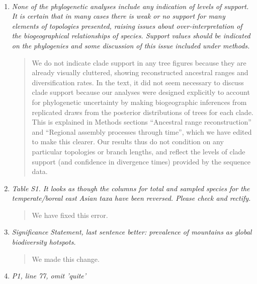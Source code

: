 \documentclass[11pt]{letter}
\begin{document}
\begin{letter}{ \\

}
\begin{enumerate}
\begin{quote}
    We have included this information (in edited form) in the SI text
    (line 202).
  \end{quote}

\item \textit{None of the phylogenetic analyses include any indication
    of levels of support. It is certain that in many cases there is
    weak or no support for many elements of topologies presented,
    raising issues about over-interpretation of the biogeographical
    relationships of species. Support values should be indicated on
    the phylogenies and some discussion of this issue included under
    methods.} \label{phylouncertainty}

  \begin{quote}
    We do not indicate clade support in any tree figures because they
    are already visually cluttered, showing reconstructed ancestral
    ranges and diversification rates. In the text, it did not seem
    necessary to discuss clade support because our analyses were
    designed explicitly to account for phylogenetic uncertainty by
    making biogeographic inferences from replicated draws from the
    posterior distributions of trees for each clade. This is explained
    in Methods sections ``Ancestral range reconstruction'' and
    ``Regional assembly processes through time'', which we have edited
    to make this clearer. Our results thus do not condition on any
    particular topologies or branch lengths, and reflect the levels of
    clade support (and confidence in divergence times) provided by the
    sequence data.
  \end{quote}

\item \textit{Table S1. It looks as though the columns for total and
    sampled species for the temperate/boreal east Asian taxa have been
    reversed. Please check and rectify.}

  \begin{quote}
    We have fixed this error.
  \end{quote}

\item \textit{Significance Statement, last sentence better: prevalence
    of mountains as global biodiversity hotspots.}

  \begin{quote}
    We made this change.
  \end{quote}

\item \textit{P1, line 77, omit 'quite'}


\end{enumerate}
\end{letter}
\end{document}
